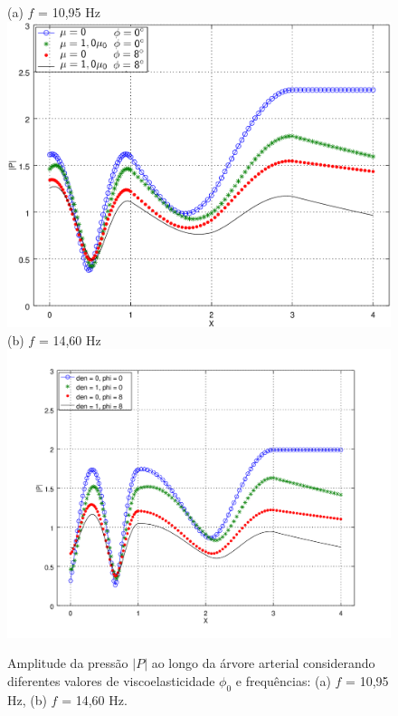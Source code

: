 \begin{figure}[!htbp]
	\centering
	(a) $f$ = 10,95 Hz\\
	\includegraphics[scale=0.7]{Figures/fig5_P_f10_95_viscoelasticity_viscosity_NEW.png}\\
	(b) $f$ = 14,60 Hz\\
	\includegraphics[scale=0.7]{Figures/fig5_P_f14_60_viscoelasticity_viscosity.png}\\
	\caption{Amplitude da pressão $|P|$ ao longo da árvore arterial considerando diferentes valores de viscoelasticidade $\phi_0$ e frequências: (a) $f$ = 10,95 Hz, (b) $f$ = 14,60 Hz.}
	\label{fig5b:arterial-tree}%
\end{figure}

